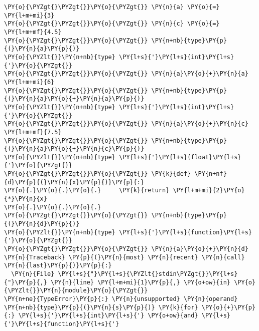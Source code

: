 \begin{Verbatim}[commandchars=\\\{\}]
\PY{o}{\PYZgt{}\PYZgt{}}\PY{o}{\PYZgt{}} \PY{n}{a} \PY{o}{=} \PY{l+m+mi}{3}
\PY{o}{\PYZgt{}\PYZgt{}}\PY{o}{\PYZgt{}} \PY{n}{c} \PY{o}{=} \PY{l+m+mf}{4.5}
\PY{o}{\PYZgt{}\PYZgt{}}\PY{o}{\PYZgt{}} \PY{n+nb}{type}\PY{p}{(}\PY{n}{a}\PY{p}{)}
\PY{o}{\PYZlt{}}\PY{n+nb}{type} \PY{l+s}{'}\PY{l+s}{int}\PY{l+s}{'}\PY{o}{\PYZgt{}}
\PY{o}{\PYZgt{}\PYZgt{}}\PY{o}{\PYZgt{}} \PY{n}{a}\PY{o}{+}\PY{n}{a}
\PY{l+m+mi}{6}
\PY{o}{\PYZgt{}\PYZgt{}}\PY{o}{\PYZgt{}} \PY{n+nb}{type}\PY{p}{(}\PY{n}{a}\PY{o}{+}\PY{n}{a}\PY{p}{)}
\PY{o}{\PYZlt{}}\PY{n+nb}{type} \PY{l+s}{'}\PY{l+s}{int}\PY{l+s}{'}\PY{o}{\PYZgt{}}
\PY{o}{\PYZgt{}\PYZgt{}}\PY{o}{\PYZgt{}} \PY{n}{a}\PY{o}{+}\PY{n}{c}
\PY{l+m+mf}{7.5}
\PY{o}{\PYZgt{}\PYZgt{}}\PY{o}{\PYZgt{}} \PY{n+nb}{type}\PY{p}{(}\PY{n}{a}\PY{o}{+}\PY{n}{c}\PY{p}{)}
\PY{o}{\PYZlt{}}\PY{n+nb}{type} \PY{l+s}{'}\PY{l+s}{float}\PY{l+s}{'}\PY{o}{\PYZgt{}}
\PY{o}{\PYZgt{}\PYZgt{}}\PY{o}{\PYZgt{}} \PY{k}{def} \PY{n+nf}{d}\PY{p}{(}\PY{n}{x}\PY{p}{)}\PY{p}{:}
\PY{o}{.}\PY{o}{.}\PY{o}{.}     \PY{k}{return} \PY{l+m+mi}{2}\PY{o}{*}\PY{n}{x}
\PY{o}{.}\PY{o}{.}\PY{o}{.} 
\PY{o}{\PYZgt{}\PYZgt{}}\PY{o}{\PYZgt{}} \PY{n+nb}{type}\PY{p}{(}\PY{n}{d}\PY{p}{)}
\PY{o}{\PYZlt{}}\PY{n+nb}{type} \PY{l+s}{'}\PY{l+s}{function}\PY{l+s}{'}\PY{o}{\PYZgt{}}
\PY{o}{\PYZgt{}\PYZgt{}}\PY{o}{\PYZgt{}} \PY{n}{a}\PY{o}{+}\PY{n}{d}
\PY{n}{Traceback} \PY{p}{(}\PY{n}{most} \PY{n}{recent} \PY{n}{call} \PY{n}{last}\PY{p}{)}\PY{p}{:}
  \PY{n}{File} \PY{l+s}{"}\PY{l+s}{\PYZlt{}stdin\PYZgt{}}\PY{l+s}{"}\PY{p}{,} \PY{n}{line} \PY{l+m+mi}{1}\PY{p}{,} \PY{o+ow}{in} \PY{o}{\PYZlt{}}\PY{n}{module}\PY{o}{\PYZgt{}}
\PY{n+ne}{TypeError}\PY{p}{:} \PY{n}{unsupported} \PY{n}{operand} \PY{n+nb}{type}\PY{p}{(}\PY{n}{s}\PY{p}{)} \PY{k}{for} \PY{o}{+}\PY{p}{:} \PY{l+s}{'}\PY{l+s}{int}\PY{l+s}{'} \PY{o+ow}{and} \PY{l+s}{'}\PY{l+s}{function}\PY{l+s}{'}
\end{Verbatim}
